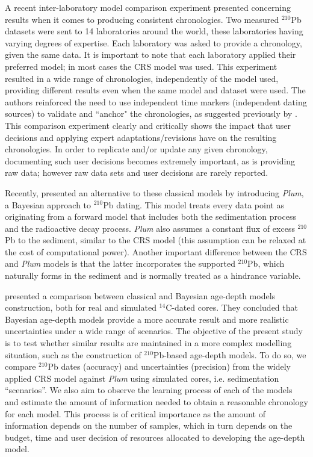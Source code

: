 \documentclass [10pt] {article}
\begin{document}
	A recent inter-laboratory model comparison experiment \citep{Barsanti2020} presented concerning results when it comes to producing consistent chronologies.
Two measured $^{210}$Pb datasets were sent to 14 laboratories around the world, these laboratories having varying degrees of expertise.
Each laboratory was asked to provide a chronology, given the same data. 
It is important to note that each laboratory applied their preferred model; in most cases the CRS model was used.
This experiment resulted in a wide range of chronologies, independently of the model used, providing different results even when the same model and dataset were used.
The authors reinforced the need to use independent time markers (independent dating sources) to validate and ``anchor" the chronologies, as suggested previously by \citep{Smith2001}.  
This comparison experiment clearly and critically shows the impact that user decisions and applying expert adaptations/revisions have on the resulting chronologies.
In order to replicate and/or update any given chronology, documenting such user decisions becomes extremely important, as is providing raw data; however raw data sets and user decisions are rarely reported.

	Recently, \citet{Aquino2018} presented an alternative to these classical models by introducing \textit{Plum}, a Bayesian approach to $^{210}$Pb dating.
This model treats every data point as originating from a forward model that includes both the sedimentation process and the radioactive decay process.
\textit{Plum} also assumes a constant flux of excess $^{210}$Pb to the sediment, similar to the CRS model (this assumption can be relaxed at the cost of computational power).
Another important difference between the CRS and \textit{Plum} models is that the latter incorporates the supported $^{210}$Pb, which naturally forms in the sediment and is normally treated as a hindrance variable.

	\citet{Blaauw2018} presented a comparison between classical and Bayesian age-depth models construction, both for real and simulated $^{14}$C-dated cores.
They concluded that Bayesian age-depth models provide a more accurate result and more realistic uncertainties under a wide range of scenarios.  
The objective of the present study is to test whether similar results are maintained in a more complex modelling situation, such as the construction of $^{210}$Pb-based age-depth models.
To do so, we compare $^{210}$Pb dates (accuracy) and uncertainties (precision) from the widely applied CRS model against \textit{Plum} using simulated cores, i.e. sedimentation ``scenarios''.
We also aim to observe the learning process of each of the models and estimate the amount of information needed to obtain a reasonable chronology for each model.
This process is of critical importance as the amount of information depends on the number of samples, which in turn depends on the budget, time and user decision of resources allocated to developing the age-depth model. 
\end{document}
